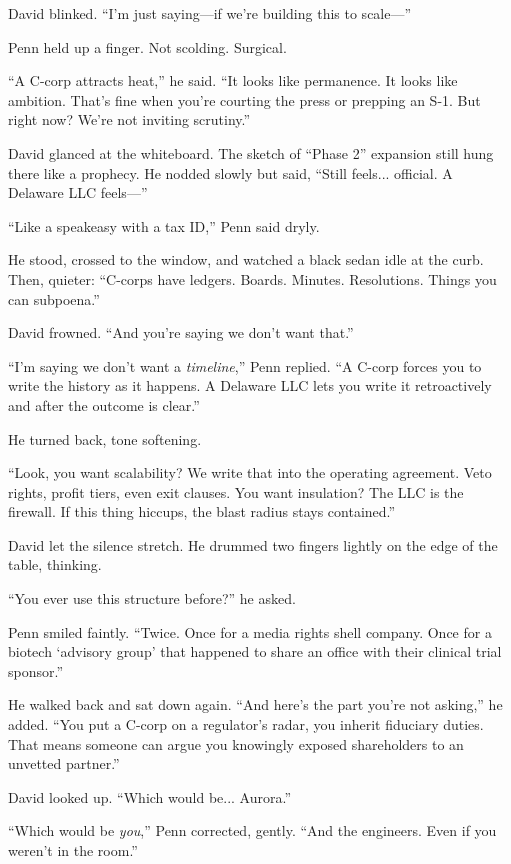 David blinked. ``I’m just saying---if we’re building this to scale---''

Penn held up a finger. Not scolding. Surgical.

``A C-corp attracts heat,'' he said. ``It looks like permanence. It looks like ambition. That’s fine when you're courting 
the press or prepping an S-1. But right now? We’re not inviting scrutiny.''

David glanced at the whiteboard. The sketch of ``Phase 2'' expansion still hung there like a prophecy. He nodded slowly 
but said, ``Still feels... official. A Delaware LLC feels---''

``Like a speakeasy with a tax ID,'' Penn said dryly. 

He stood, crossed to the window, and watched a black sedan idle at the curb. Then, quieter: ``C-corps have ledgers. Boards. 
Minutes. Resolutions. Things you can subpoena.''

David frowned. ``And you’re saying we don’t want that.''

``I’m saying we don’t want a \textit{timeline},'' Penn replied. ``A C-corp forces you to write the history as it happens. 
A Delaware LLC lets you write it retroactively and after the outcome is clear.''

He turned back, tone softening.

``Look, you want scalability? We write that into the operating agreement. Veto rights, profit tiers, even exit clauses. 
You want insulation? The LLC is the firewall. If this thing hiccups, the blast radius stays contained.''

David let the silence stretch. He drummed two fingers lightly on the edge of the table, thinking.

``You ever use this structure before?'' he asked.

Penn smiled faintly. ``Twice. Once for a media rights shell company. Once for a biotech `advisory group' that happened to 
share an office with their clinical trial sponsor.''

He walked back and sat down again. ``And here’s the part you’re not asking,'' he added. ``You put a C-corp on a regulator’s 
radar, you inherit fiduciary duties. That means someone can argue you knowingly exposed shareholders to an unvetted partner.''

David looked up. ``Which would be... Aurora.''

``Which would be \textit{you},'' Penn corrected, gently. ``And the engineers. Even if you weren’t in the room.''

